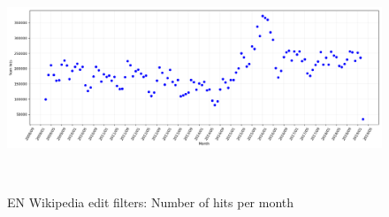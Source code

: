 \begin{figure}
\centering
  \includegraphics[width=0.9\columnwidth]{pics/filter-hits-zoomed.png}
  \caption{EN Wikipedia edit filters: Number of hits per month}~\label{fig:filter-hits}
\end{figure}

